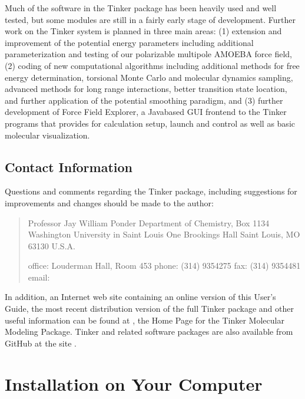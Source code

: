 \documentclass[letterpaper,11pt,english]{sphinxmanual}
\begin{document}
Much of the software in the Tinker package has been heavily used and well tested, but some modules are still in a fairly early stage of development. Further work on the Tinker system is planned in three main areas: (1) extension and improvement of the potential energy parameters including additional parameterization and testing of our polarizable multipole AMOEBA force field, (2) coding of new computational algorithms including additional methods for free energy determination, torsional Monte Carlo and molecular dynamics sampling, advanced methods for long range interactions, better transition state location, and further application of the potential smoothing paradigm, and (3) further development of Force Field Explorer, a Java\sphinxhyphen{}based GUI front\sphinxhyphen{}end to the Tinker programs that provides for calculation setup, launch and control as well as basic molecular visualization.


\section{Contact Information}
\label{\detokenize{text/introduction:contact-information}}
Questions and comments regarding the Tinker package, including suggestions for improvements and changes should be made to the author:
\begin{quote}

Professor Jay William Ponder
Department of Chemistry, Box 1134
Washington University in Saint Louis
One Brookings Hall
Saint Louis, MO 63130 U.S.A.

office: Louderman Hall, Room 453
phone:  (314) 935\sphinxhyphen{}4275
fax:    (314) 935\sphinxhyphen{}4481
email:  
\end{quote}

In addition, an Internet web site containing an online version of this User’s Guide, the most recent distribution version of the full Tinker package and other useful information can be found at , the Home Page for the Tinker Molecular Modeling Package. Tinker and related software packages are also available from GitHub at the site .


\chapter{Installation on Your Computer}
\label{\detokenize{text/installation:installation-on-your-computer}}\label{\detokenize{text/installation::doc}}
\end{document}
